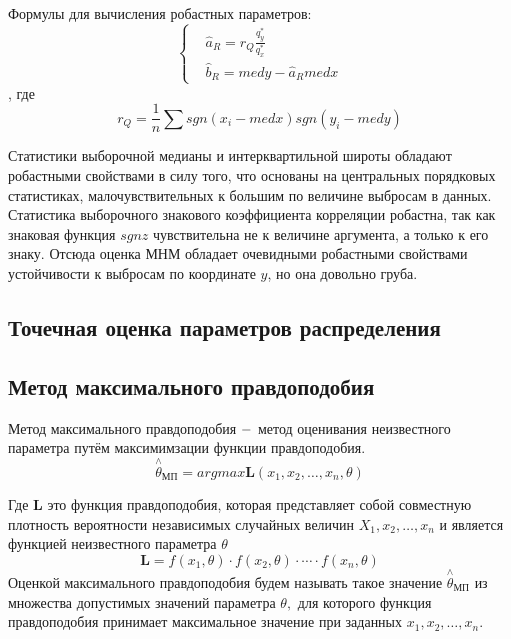 \documentclass[a4]{article}
\begin{document}
Формулы для вычисления робастных параметров:
\begin{equation}
\begin{cases}
&  \hat{a}_{R} = r_{Q}\frac{q_{y}^{*}}{q_{x}^{*}} \\ 
&  \hat{b}_{R}= medy - \hat{a}_{R}medx
\end{cases}
\end{equation}, где 
\begin{equation}
r_{Q} = \frac{1}{n}\sum sgn(x_{i} - medx)sgn(y_{i} - medy)
\end{equation}

Статистики выборочной медианы и интерквартильной широты обладают
робастными свойствами в силу того, что основаны на центральных порядковых статистиках, малочувствительных к большим по величине выбросам
в данных. Статистика выборочного знакового коэффициента корреляции
робастна, так как знаковая функция $ sgn z $ чувствительна не к величине
аргумента, а только к его знаку. Отсюда оценка МНМ обладает очевидными робастными свойствами устойчивости к выбросам по
координате $ y $, но она довольно груба.

\subsection{Точечная оценка параметров распределения}
\subsection{Метод максимального правдоподобия}
Метод максимального правдоподобия $\--$ метод оценивания неизвестного параметра путём максимимзации функции правдоподобия.
\begin{equation}
\overset{\wedge}{\theta}_{\text{МП}}=argmax \mathbf{L}(x_1,x_2,\ldots,x_n,\theta)
\end{equation}

Где $\mathbf{L}$ это функция правдоподобия, которая представляет собой совместную плотность вероятности независимых случайных величин $X_1,x_2,\ldots,x_n$ и является функцией неизвестного параметра $\theta$
\begin{equation}
\mathbf{L} = f(x_1,\theta)\cdot f(x_2,\theta)\cdot\cdots\cdot f(x_n,\theta)
\end{equation}
Оценкой максимального правдоподобия будем называть такое значение $\overset{\wedge}{\theta}_{\text{МП}}$ из множества допустимых значений параметра $\theta,$ для которого функция правдоподобия принимает максимальное значение при заданных $x_1,x_2,\ldots,x_n.$
\end{document}

